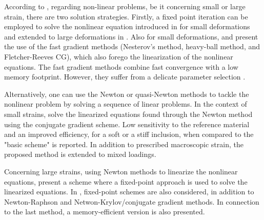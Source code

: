 According to \cite{kabel_efficient_2014}, regarding non-linear problems, be it concerning small or large strain, there are two solution strategies.
Firstly, a fixed point iteration can be employed to solve the nonlinear equation introduced in \cite{moulinec_numerical_1998} for small deformations and extended to large deformations in \cite{eisenlohr_spectral_2013}.
Also for small deformations, \cite{schneider_fft-based_2017} and \cite{schneider_dynamical_2020} present the use of the fast gradient methods (Nesterov's method, heavy-ball method, and Fletcher-Reeves CG), which also forego the linearization of the nonlinear equations.
The fast gradient methods combine fast convergence with a low memory footprint.
However, they suffer from a delicate parameter selection \citep{schneider_dynamical_2020}.

Alternatively, one can use the Newton or quasi-Newton methods to tackle the nonlinear problem by solving a sequence of linear problems.
In the context of small strains, \cite{gelebart_non-linear_2013} solve the linearized equations found through the Newton method using the conjugate gradient scheme.
Low sensitivity to the reference material and an improved efficiency, for a soft or a stiff inclusion, when compared to the "basic scheme" is reported.
In addition to prescribed macroscopic strain, the proposed method is extended to mixed loadings.

Concerning large strains, using Newton methods to linearize the nonlinear equations, \cite{lahellec_analysis_2003} present a scheme where a fixed-point approach is used to solve the linearized equations.
In \cite{kabel_efficient_2014}, fixed-point schemes are also considered, in addition to Newton-Raphson and Netwon-Krylov/conjugate gradient methods.
In connection to the last method, a memory-efficient version is also presented.

